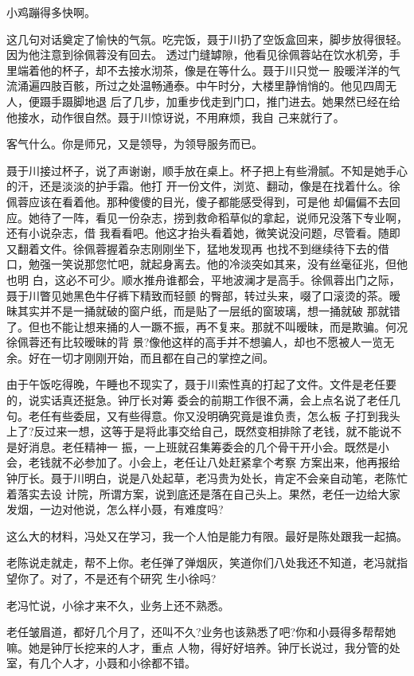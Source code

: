 \documentclass[11pt,a4paper,onecolumn]{article}
\begin{document}
小鸡蹦得多快啊。

这几句对话奠定了愉快的气氛。吃完饭，聂于川扔了空饭盒回来，脚步放得很轻。因为他注意到徐佩蓉没有回去。
透过门缝罅隙，他看见徐佩蓉站在饮水机旁，手里端着他的杯子，却不去接水沏茶，像是在等什么。聂于川只觉一
股暖洋洋的气流涌遍四肢百骸，所过之处温畅通泰。中午时分，大楼里静悄悄的。他见四周无人，便蹑手蹑脚地退
后了几步，加重步伐走到门口，推门进去。她果然已经在给他接水，动作很自然。聂于川惊讶说，不用麻烦，我自
己来就行了。

客气什么。你是师兄，又是领导，为领导服务而已。

聂于川接过杯子，说了声谢谢，顺手放在桌上。杯子把上有些滑腻。不知是她手心的汗，还是淡淡的护手霜。他打
开一份文件，浏览、翻动，像是在找着什么。徐佩蓉应该在看着他。那种傻傻的目光，傻子都能感受得到，可是他
却偏偏不去回应。她待了一阵，看见一份杂志，捞到救命稻草似的拿起，说师兄没落下专业啊，还有小说杂志，借
我看看吧。他这才抬头看着她，微笑说没问题，尽管看。随即又翻着文件。徐佩蓉握着杂志刚刚坐下，猛地发现再
也找不到继续待下去的借口，勉强一笑说那您忙吧，就起身离去。他的冷淡突如其来，没有丝毫征兆，但他也明
白，这必不可少。顺水推舟谁都会，平地波澜才是高手。徐佩蓉出门之际，聂于川瞥见她黑色牛仔裤下精致而轻颤
的臀部，转过头来，啜了口滚烫的茶。暧昧其实并不是一捅就破的窗户纸，而是贴了一层纸的窗玻璃，想一捅就破
那就错了。但也不能让想来捅的人一蹶不振，再不复来。那就不叫暧昧，而是欺骗。何况徐佩蓉还有比较暧昧的背
景?像他这样的高手并不想骗人，却也不愿被人一览无余。好在一切才刚刚开始，而且都在自己的掌控之间。

由于午饭吃得晚，午睡也不现实了，聂于川索性真的打起了文件。文件是老任要的，说实话真还挺急。钟厅长对筹
委会的前期工作很不满，会上点名说了老任几句。老任有些委屈，又有些得意。你又没明确究竟是谁负责，怎么板
子打到我头上了?反过来一想，这等于是将此事交给自己，既然变相排除了老钱，就不能说不是好消息。老任精神一
振，一上班就召集筹委会的几个骨干开小会。既然是小会，老钱就不必参加了。小会上，老任让八处赶紧拿个考察
方案出来，他再报给钟厅长。聂于川明白，说是八处起草，老冯贵为处长，肯定不会亲自动笔，老陈忙着落实去设
计院，所谓方案，说到底还是落在自己头上。果然，老任一边给大家发烟，一边对他说，怎么样小聂，有难度吗?

这么大的材料，冯处又在学习，我一个人怕是能力有限。最好是陈处跟我一起搞。

老陈说走就走，帮不上你。老任弹了弹烟灰，笑道你们八处我还不知道，老冯就指望你了。对了，不是还有个研究
生小徐吗?

老冯忙说，小徐才来不久，业务上还不熟悉。

老任皱眉道，都好几个月了，还叫不久?业务也该熟悉了吧?你和小聂得多帮帮她嘛。她是钟厅长挖来的人才，重点
人物，得好好培养。钟厅长说过，我分管的处室，有几个人才，小聂和小徐都不错。
\end{document}
